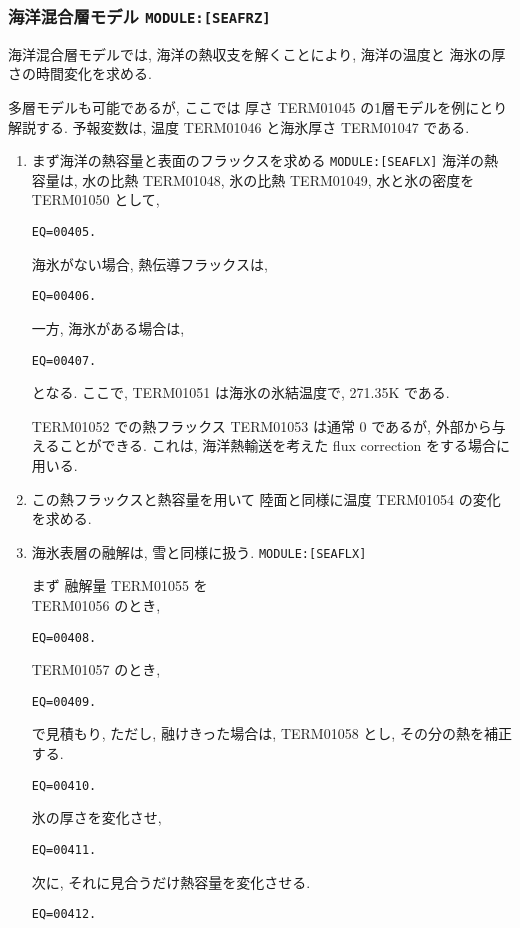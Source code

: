 \subsubsection{海洋混合層モデル \texttt{MODULE:[SEAFRZ]}}

海洋混合層モデルでは,
海洋の熱収支を解くことにより, 海洋の温度と
海氷の厚さの時間変化を求める.

多層モデルも可能であるが,
ここでは 厚さ TERM01045 の1層モデルを例にとり解説する.
予報変数は, 温度 TERM01046 と海氷厚さ TERM01047 である.

\begin{enumerate}
\item  まず海洋の熱容量と表面のフラックスを求める
       \texttt{MODULE:[SEAFLX]}
海洋の熱容量は,
水の比熱 TERM01048, 氷の比熱 TERM01049, 水と氷の密度を TERM01050 として,
\begin{verbatim}
EQ=00405.
\end{verbatim}

海氷がない場合, 熱伝導フラックスは,
\begin{verbatim}
EQ=00406.
\end{verbatim}
一方, 海氷がある場合は,
\begin{verbatim}
EQ=00407.
\end{verbatim}
となる. ここで, TERM01051 は海氷の氷結温度で, 271.35K である.

TERM01052 での熱フラックス TERM01053 は通常 0 であるが,
外部から与えることができる.
これは, 海洋熱輸送を考えた flux correction をする場合に用いる.

\item この熱フラックスと熱容量を用いて
      陸面と同様に温度 TERM01054 の変化を求める.

\item 海氷表層の融解は, 雪と同様に扱う.
       \texttt{MODULE:[SEAFLX]}

まず 融解量 TERM01055 を  \\
TERM01056 のとき, 
\begin{verbatim}
EQ=00408.
\end{verbatim}
TERM01057 のとき, 
\begin{verbatim}
EQ=00409.
\end{verbatim}
で見積もり,
ただし, 融けきった場合は, TERM01058 とし, その分の熱を補正する.
\begin{verbatim}
EQ=00410.
\end{verbatim}
氷の厚さを変化させ,
\begin{verbatim}
EQ=00411.
\end{verbatim}
次に, それに見合うだけ熱容量を変化させる.
\begin{verbatim}
EQ=00412.
\end{verbatim}


\end{enumerate}
